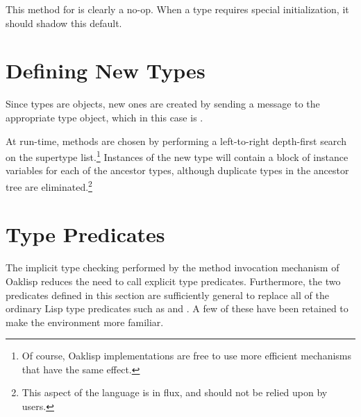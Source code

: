 
This method for  is clearly a no-op.  When a type
requires special initialization, it should shadow this default.

\section{Defining New Types}

Since types are objects, new ones are created by sending
a  message to the appropriate type object, which in this
case is .


At run-time, methods are chosen by performing a left-to-right
depth-first search on the supertype list.\footnote{Of course, Oaklisp
implementations are free to use more efficient mechanisms that have
the same effect.} Instances of the new type will contain a block of
instance variables for each of the ancestor types, although duplicate
types in the ancestor tree are eliminated.\footnote{This aspect of the
language is in flux, and should not be relied upon by users.}

\section{Type Predicates}

The implicit type checking performed by the method invocation
mechanism of Oaklisp reduces the need to call explicit type
predicates.  Furthermore, the two predicates defined in this section
are sufficiently general to replace all of the ordinary Lisp type
predicates such as  and .  A few of these have
been retained to make the environment more familiar.




